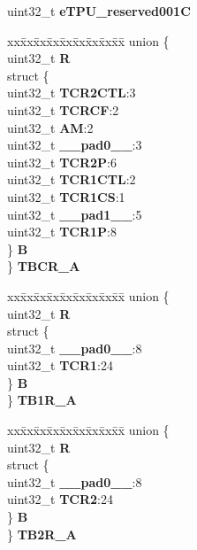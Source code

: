 \begin{DoxyCompactItemize}
\begin{tabbing}
\end{tabbing}\item 
\mbox{\label{structETPU__tag_acbecf339f9c655c6a9e614305d49fefd}} 
uint32\+\_\+t {\bfseries e\+T\+P\+U\+\_\+reserved001C}
\item 
\mbox{\label{structETPU__tag_ae0b7344b1275437b05a43e965617ad33}} 
\begin{tabbing}
xx\=xx\=xx\=xx\=xx\=xx\=xx\=xx\=xx\=\kill
union \{\\
\>uint32\_t {\bfseries R}\\
\>struct \{\\
\>\>uint32\_t {\bfseries TCR2CTL}:3\\
\>\>uint32\_t {\bfseries TCRCF}:2\\
\>\>uint32\_t {\bfseries AM}:2\\
\>\>uint32\_t {\bfseries \_\_pad0\_\_}:3\\
\>\>uint32\_t {\bfseries TCR2P}:6\\
\>\>uint32\_t {\bfseries TCR1CTL}:2\\
\>\>uint32\_t {\bfseries TCR1CS}:1\\
\>\>uint32\_t {\bfseries \_\_pad1\_\_}:5\\
\>\>uint32\_t {\bfseries TCR1P}:8\\
\>\} {\bfseries B}\\
\} {\bfseries TBCR\_A}\\

\end{tabbing}\item 
\mbox{\label{structETPU__tag_aaffde566c5b536b53e0f4ff3ef1494ee}} 
\begin{tabbing}
xx\=xx\=xx\=xx\=xx\=xx\=xx\=xx\=xx\=\kill
union \{\\
\>uint32\_t {\bfseries R}\\
\>struct \{\\
\>\>uint32\_t {\bfseries \_\_pad0\_\_}:8\\
\>\>uint32\_t {\bfseries TCR1}:24\\
\>\} {\bfseries B}\\
\} {\bfseries TB1R\_A}\\

\end{tabbing}\item 
\mbox{\label{structETPU__tag_a203d4b1441f87482a3e6d29ce5722394}} 
\begin{tabbing}
xx\=xx\=xx\=xx\=xx\=xx\=xx\=xx\=xx\=\kill
union \{\\
\>uint32\_t {\bfseries R}\\
\>struct \{\\
\>\>uint32\_t {\bfseries \_\_pad0\_\_}:8\\
\>\>uint32\_t {\bfseries TCR2}:24\\
\>\} {\bfseries B}\\
\} {\bfseries TB2R\_A}\\


\end{tabbing}
\end{DoxyCompactItemize}
